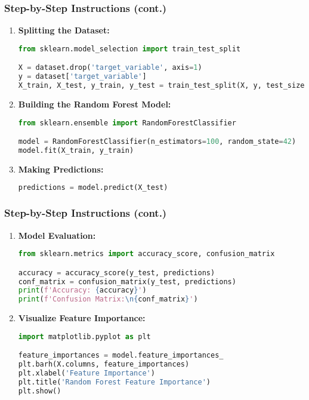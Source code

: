 \documentclass[aspectratio=169]{beamer}
\begin{document}
\begin{frame}[fragile]
    \frametitle{Step-by-Step Instructions (cont.)}
    \begin{enumerate}[resume]
        \item \textbf{Splitting the Dataset:}
            \begin{lstlisting}[language=Python]
from sklearn.model_selection import train_test_split

X = dataset.drop('target_variable', axis=1)
y = dataset['target_variable']
X_train, X_test, y_train, y_test = train_test_split(X, y, test_size=0.2, random_state=42)
            \end{lstlisting}

        \item \textbf{Building the Random Forest Model:}
            \begin{lstlisting}[language=Python]
from sklearn.ensemble import RandomForestClassifier

model = RandomForestClassifier(n_estimators=100, random_state=42)
model.fit(X_train, y_train)
            \end{lstlisting}

        \item \textbf{Making Predictions:}
            \begin{lstlisting}[language=Python]
predictions = model.predict(X_test)
            \end{lstlisting}
    \end{enumerate}
\end{frame}

\begin{frame}[fragile]
    \frametitle{Step-by-Step Instructions (cont.)}
    \begin{enumerate}[resume]
        \item \textbf{Model Evaluation:}
            \begin{lstlisting}[language=Python]
from sklearn.metrics import accuracy_score, confusion_matrix

accuracy = accuracy_score(y_test, predictions)
conf_matrix = confusion_matrix(y_test, predictions)
print(f'Accuracy: {accuracy}')
print(f'Confusion Matrix:\n{conf_matrix}')
            \end{lstlisting}
        
        \item \textbf{Visualize Feature Importance:}
            \begin{lstlisting}[language=Python]
import matplotlib.pyplot as plt

feature_importances = model.feature_importances_
plt.barh(X.columns, feature_importances)
plt.xlabel('Feature Importance')
plt.title('Random Forest Feature Importance')
plt.show()
            \end{lstlisting}
    \end{enumerate}
\end{frame}
\end{document}
